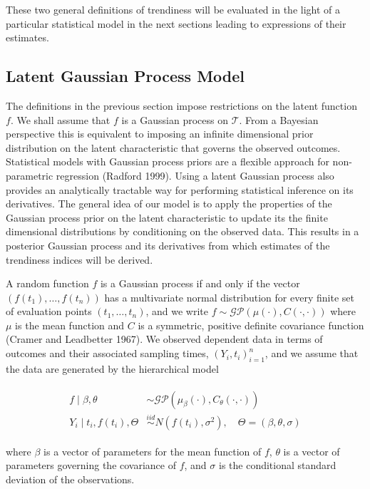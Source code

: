 \documentclass[11pt,]{article}
\theoremstyle{nonumberplain}
\begin{document}
These two general definitions of trendiness will be evaluated in the
light of a particular statistical model in the next sections leading to
expressions of their estimates.

\subsection{Latent Gaussian Process
Model}\label{latent-gaussian-process-model}

The definitions in the previous section impose restrictions on the
latent function \(f\). We shall assume that \(f\) is a Gaussian process
on \(\mathcal{T}\). From a Bayesian perspective this is equivalent to
imposing an infinite dimensional prior distribution on the latent
characteristic that governs the observed outcomes. Statistical models
with Gaussian process priors are a flexible approach for non-parametric
regression (Radford 1999). Using a latent Gaussian process also provides
an analytically tractable way for performing statistical inference on
its derivatives. The general idea of our model is to apply the
properties of the Gaussian process prior on the latent characteristic to
update its the finite dimensional distributions by conditioning on the
observed data. This results in a posterior Gaussian process and its
derivatives from which estimates of the trendiness indices will be
derived.

A random function \(f\) is a Gaussian process if and only if the vector
\((f(t_1), \ldots, f(t_n))\) has a multivariate normal distribution for
every finite set of evaluation points \((t_1, \ldots, t_n)\), and we
write \(f \sim \mathcal{GP}(\mu(\cdot), C(\cdot, \cdot))\) where \(\mu\)
is the mean function and \(C\) is a symmetric, positive definite
covariance function (Cramer and Leadbetter 1967). We observed dependent
data in terms of outcomes and their associated sampling times,
\((Y_i, t_i)_{i=1}^n\), and we assume that the data are generated by the
hierarchical model

\begin{align}
\begin{split}
  f \mid \beta, \theta &\sim \mathcal{GP}(\mu_\beta(\cdot), C_\theta(\cdot,\cdot))\\
  Y_i \mid t_i, f(t_i), \Theta &\overset{iid}{\sim} N(f(t_i), \sigma^2), \quad \Theta = (\beta, \theta, \sigma)
\end{split}
\label{eq:generatingProcess}
\end{align}

where \(\beta\) is a vector of parameters for the mean function of
\(f\), \(\theta\) is a vector of parameters governing the covariance of
\(f\), and \(\sigma\) is the conditional standard deviation of the
observations.
\end{document}
